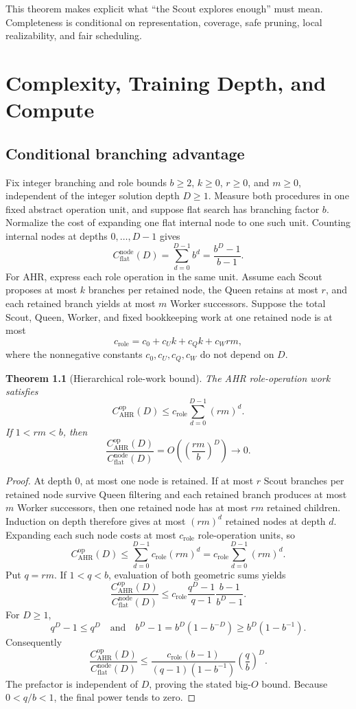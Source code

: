 \documentclass[11pt,oneside]{book}
\newtheorem{theorem}[definition]{Theorem}
\theoremstyle{remark}
\begin{document}
This theorem makes explicit what ``the Scout explores enough'' must mean. Completeness is conditional on representation, coverage, safe pruning, local realizability, and fair scheduling.

\chapter{Complexity, Training Depth, and Compute}

\section{Conditional branching advantage}

Fix integer branching and role bounds
$b\ge2$, $k\ge0$, $r\ge0$, and $m\ge0$, independent of the integer solution
depth $D\ge1$. Measure both procedures in one fixed abstract operation unit,
and suppose flat search has branching factor $b$. Normalize the cost of
expanding one flat internal node to one such unit. Counting internal nodes
at depths $0,\ldots,D-1$ gives
\[
C_{\mathrm{flat}}^{\mathrm{node}}(D)
=\sum_{d=0}^{D-1}b^d=\frac{b^D-1}{b-1}.
\]
For AHR, express each role operation in the same unit. Assume each Scout
proposes at most $k$ branches per retained node, the Queen retains at most
$r$, and each retained branch yields at most $m$ Worker successors. Suppose
the total Scout, Queen, Worker, and fixed bookkeeping work at one retained
node is at most
\[
c_{\mathrm{role}}
=c_0+c_Uk+c_Qk+c_Wrm,
\]
where the nonnegative constants $c_0,c_U,c_Q,c_W$ do not depend on $D$.

\begin{theorem}[Hierarchical role-work bound]
The AHR role-operation work satisfies
\[
C_{\mathrm{AHR}}^{\mathrm{op}}(D)
\le c_{\mathrm{role}}\sum_{d=0}^{D-1}(rm)^d.
\]
If $1<rm<b$, then
\[
\frac{C_{\mathrm{AHR}}^{\mathrm{op}}(D)}
{C_{\mathrm{flat}}^{\mathrm{node}}(D)}
=O\!\left(\left(\frac{rm}{b}\right)^D\right)\to0.
\]
\end{theorem}

\begin{proof}
At depth $0$, at most one node is retained. If at most $r$ Scout branches
per retained node survive Queen filtering and each retained branch produces
at most $m$ Worker successors, then one retained node has at most $rm$
retained children. Induction on depth therefore gives at most $(rm)^d$
retained nodes at depth $d$. Expanding each such node costs at most
$c_{\mathrm{role}}$ role-operation units, so
\[
C_{\mathrm{AHR}}^{\mathrm{op}}(D)
\le\sum_{d=0}^{D-1}c_{\mathrm{role}}(rm)^d
=c_{\mathrm{role}}\sum_{d=0}^{D-1}(rm)^d.
\]
Put $q=rm$. If $1<q<b$, evaluation of both geometric sums yields
\[
\frac{C_{\mathrm{AHR}}^{\mathrm{op}}(D)}
{C_{\mathrm{flat}}^{\mathrm{node}}(D)}
\le
c_{\mathrm{role}}
\frac{q^D-1}{q-1}
\frac{b-1}{b^D-1}.
\]
For $D\ge1$,
\[
q^D-1\le q^D
\quad\text{and}\quad
b^D-1=b^D(1-b^{-D})\ge b^D(1-b^{-1}).
\]
Consequently
\[
\frac{C_{\mathrm{AHR}}^{\mathrm{op}}(D)}
{C_{\mathrm{flat}}^{\mathrm{node}}(D)}
\le
\frac{c_{\mathrm{role}}(b-1)}
{(q-1)(1-b^{-1})}
\left(\frac qb\right)^D.
\]
The prefactor is independent of $D$, proving the stated big-$O$ bound.
Because $0<q/b<1$, the final power tends to zero.
\end{proof}
\end{document}
